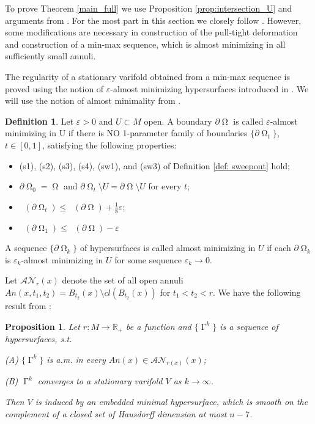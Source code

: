 \documentclass[12pt]{amsart}
\newtheorem{proposition}[theorem]{Proposition}
\DeclareMathOperator{\Hn}{\mathcal{H}^n}
\DeclareMathOperator{\G}{\Gamma}
\DeclareMathOperator{\Om}{\Omega}
\theoremstyle{definition}
\newtheorem{definition}[theorem]{Definition}
\begin{document}
To prove Theorem \ref*{main_full} we use Proposition \ref*{prop:intersection_U} 
and arguments from \cite{DT}.
For the most part in this section we closely follow \cite{DT}.
However, some modifications are necessary 
in construction of the pull-tight deformation and 
construction of a min-max sequence, which is almost minimizing
in all sufficiently small annuli.

The regularity of a stationary varifold obtained
from a min-max sequence is proved using the notion 
of $\varepsilon$-almost minimizing hypersurfaces introduced
in \cite{Pi}. We will use the notion of almost minimality from 
\cite[2.2]{DT}. 

\begin{definition}
Let $\varepsilon>0$  and $U \subset M$ open. A boundary $\partial \Om$
is called $\varepsilon$-almost minimizing in U if there is NO 1-parameter
family of boundaries $\{ \partial \Om_t \}$, $t \in [0, 1]$, 
satisfying the following properties:

\begin{itemize}
    \item (s1), (s2), (s3), (s4), (sw1), and (sw3) of Definition \ref*{def: sweepout} hold;
    \item $\partial \Om_0 = \Om$ and $\partial \Om _t  \setminus U = \partial \Om  \setminus U$
    for every $t$;
    \item $\Hn(\partial \Om_t) \leq \Hn(\partial \Om) + \frac{1}{8} \varepsilon$;
    \item $\Hn(\partial \Om_1) \leq \Hn(\partial \Om) - \varepsilon$
\end{itemize}


A sequence $\{\partial \Om_k \}$ of hypersurfaces is called almost minimizing in $U$ if
each $\partial \Om_k$ is $\varepsilon_k$-almost minimizing in $U$ 
for some sequence $\varepsilon_k \rightarrow 0$.
\end{definition}

Let $\mathcal{AN}_{r}(x)$ denote the 
set of all open annuli $An(x,t_1,t_2)= B_{t_2}(x) \setminus cl( B_{t_2}(x))$
for $t_1 < t_2 <r$.
We have the following result from \cite{DT}:

\begin{proposition} \label{regularity}
Let $r:M \rightarrow \mathbb{R}_+$ be a function and
$\{ \G^k \}$ is a sequence of
hypersurfaces, s.t.

(A) $\{ \G^k \}$ is a.m. in every $An(x) \in \mathcal{AN}_{r(x)}(x)$;

(B) $\G^k$ converges to a stationary varifold $V$
as $k \rightarrow \infty$.

Then $V$ is induced by an embedded minimal hypersurface,
which is smooth on the complement of a closed set of Hausdorff dimension
at most $n-7$.
\end{proposition}
\end{document}
